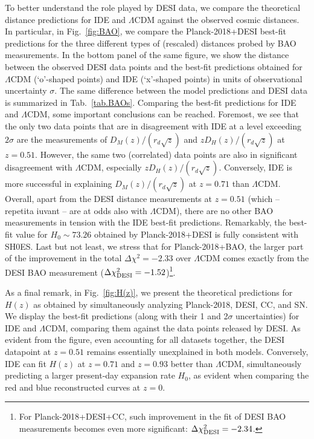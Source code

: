 \documentclass[superscriptaddress,twocolumn,showpacs,a4paper,
amssymb,amsmath,nobibnotes,aps,prl,
showkeys,
nofootinbib,notitlepage]{revtex4-1}
\begin{document}
To better understand the role played by DESI data, we compare the theoretical distance predictions for IDE and $\Lambda$CDM against the observed cosmic distances. In particular, in Fig.~\ref{fig:BAO}, we compare the Planck-2018+DESI best-fit predictions for the three different types of (rescaled) distances probed by BAO measurements. In the bottom panel of the same figure, we show the distance between the observed DESI data points and the best-fit predictions obtained for $\Lambda$CDM (‘o’-shaped points) and IDE (‘x’-shaped points) in units of observational uncertainty $\sigma$. The same difference between the model predictions and DESI data is summarized in Tab.~\ref{tab.BAOs}. Comparing the best-fit predictions for IDE and $\Lambda$CDM, some important conclusions can be reached. Foremost, we see that the only two data points that are in disagreement with IDE at a level exceeding $2\sigma$ are the measurements of $D_M(z)/(r_d \sqrt{z})$ and $z D_H(z) / (r_d\sqrt{z})$ at $z=0.51$. However, the same two (correlated) data points are also in significant disagreement with $\Lambda$CDM, especially $z D_H(z) / (r_d\sqrt{z})$. Conversely, IDE is more successful in explaining $D_M(z)/(r_d \sqrt{z})$ at $z=0.71$ than $\Lambda$CDM. Overall, apart from the DESI distance measurements at $z=0.51$ (which -- repetita iuvant -- are at odds also with $\Lambda$CDM), there are no other BAO measurements in tension with the IDE best-fit predictions. Remarkably, the best-fit value for $H_0\sim 73.26$ obtained by Planck-2018+DESI is fully consistent with SH0ES. Last but not least, we stress that for Planck-2018+BAO, the larger part of the improvement in the total $\Delta \chi^2=-2.33$ over $\Lambda$CDM comes exactly from the DESI BAO measurement ($\Delta \chi^2_{\rm{DESI}}=-1.52$)\footnote{For Planck-2018+DESI+CC, such improvement in the fit of DESI BAO measurements becomes even more significant: $\Delta \chi^2_{\rm{DESI}}=-2.34$.}.

As a final remark, in Fig.~\ref{fig:H(z)}, we present the theoretical predictions for $H(z)$ as obtained by simultaneously analyzing Planck-2018, DESI, CC, and SN. We display the best-fit predictions (along with their 1 and 2$\sigma$ uncertainties) for IDE and $\Lambda$CDM, comparing them against the data points released by DESI. As evident from the figure, even accounting for all datasets together, the DESI datapoint at $z=0.51$ remains essentially unexplained in both models. Conversely, IDE can fit $H(z)$ at $z=0.71$ and $z=0.93$ better than $\Lambda$CDM, simultaneously predicting a larger present-day expansion rate $H_0$, as evident when comparing the red and blue reconstructed curves at $z=0$. 
\end{document}
